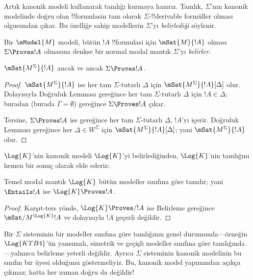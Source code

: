 \documentclass[../../../include/open-logic-section]{subfiles}
\begin{document}


Artık kanonik modeli kullanarak tamlığı kurmaya hazırız. Tamlık,
$\Sigma$'nın kanonik modelinde doğru olan !!{formula}s{}in tam olarak
$\Sigma$-!!{derivable} formüller olması olgusundan çıkar. Bu özelliğe sahip
modellerin $\Sigma$'yı \emph{belirlediği} söylenir.

\begin{defn}
  Bir $\mModel{M}$ modeli, bütün $!A$ !!{formula}s{}i için
  $\mSat{M}{!A}$ olması $\Sigma\Proves !A$ olmasına denkse bir normal modal
  mantık $\Sigma$'yı \emph{belirler}.
\end{defn}

\begin{thm}[Belirleme]
   $\mSat{M^\Sigma}{!A}$ ancak ve ancak $\Sigma\Proves !A$.
\end{thm}

\begin{proof}
  $\mSat{M^\Sigma}{!A}$ ise her tam $\Sigma$-tutarlı $\Delta$ için
  $\mSat{M^\Sigma}{!A}[\Delta]$ olur. Dolayısıyla Doğruluk Lemması
  gereğince her tam $\Sigma$-tutarlı $\Delta$ için $!A\in\Delta$;
  buradan  (burada
  $\Gamma=\emptyset$) gereğince $\Sigma\Proves !A$ çıkar.

  Tersine, $\Sigma\Proves !A$ ise
   gereğince
  her tam $\Sigma$-tutarlı $\Delta$, $!A$'yı içerir. Doğruluk Lemması
  gereğince her $\Delta\in W^\Sigma$ için
  $\mSat{M^\Sigma}{!A}[\Delta]$; yani $\mSat{M^\Sigma}{!A}$ olur.
\end{proof}

$\Log{K}$'nin kanonik modeli $\Log{K}$'yi belirlediğinden, $\Log{K}$'nin
tamlığını hemen bir sonuç olarak elde ederiz:

\begin{cor}
  Temel modal mantık $\Log{K}$ bütün modeller sınıfına göre tamdır; yani
  $\Entails !A$ ise $\Log{K}\Proves !A$.
\end{cor}

\begin{proof}
  Karşıt-ters yönde, $\Log{K}\Proves/ !A$ ise Belirleme gereğince
  $\mSat/{M^{\Log{K}}}{!A}$ ve dolayısıyla $!A$ geçerli değildir.
\end{proof}

Bir $\Sigma$ sisteminin bir modeller sınıfına göre tamlığının genel
durumunda---örneğin $\Log{KTB4}$'ün yansımalı, simetrik ve geçişli modeller
sınıfına göre tamlığında---yalnızca belirleme yeterli değildir. Ayrıca
$\Sigma$ sisteminin kanonik modelinin bu sınıfın bir üyesi olduğunu
göstermeliyiz. Bu, kanonik model yapımından açıkça çıkmaz; hatta her zaman
doğru da değildir!
\end{document}
